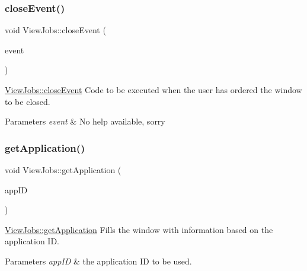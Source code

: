 \subsubsection{\texorpdfstring{close\+Event()}{closeEvent()}}
{\footnotesize\ttfamily void View\+Jobs\+::close\+Event (\begin{DoxyParamCaption}\item[{Q\+Close\+Event $\ast$}]{event }\end{DoxyParamCaption})\hspace{0.3cm}{\ttfamily [override]}}



\hyperlink{class_view_jobs_a832503ca9eb4e4bf79c2fb48a59141aa}{View\+Jobs\+::close\+Event} Code to be executed when the user has ordered the window to be closed. 


\begin{DoxyParams}{Parameters}
{\em event} & No help available, sorry \\
\hline
\end{DoxyParams}
\mbox{\label{class_view_jobs_ae9c1c806aa1dd5082b38a1dc9cbec39e}} 
\subsubsection{\texorpdfstring{get\+Application()}{getApplication()}}
{\footnotesize\ttfamily void View\+Jobs\+::get\+Application (\begin{DoxyParamCaption}\item[{int}]{app\+ID }\end{DoxyParamCaption})}



\hyperlink{class_view_jobs_ae9c1c806aa1dd5082b38a1dc9cbec39e}{View\+Jobs\+::get\+Application} Fills the window with information based on the application ID. 


\begin{DoxyParams}{Parameters}
{\em app\+ID} & the application ID to be used. \\
\hline
\end{DoxyParams}
\mbox{\label{class_view_jobs_a086650882ad80acb4074cf697f8cddcb}} 
